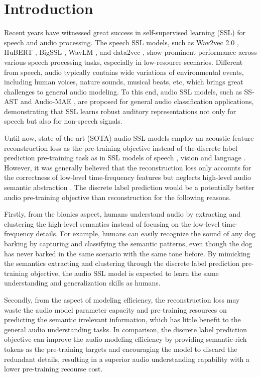 \documentclass{article}
\theoremstyle{plain}
\theoremstyle{definition}
\theoremstyle{remark}
\begin{document}
\section{Introduction}
Recent years have witnessed great success in self-supervised learning (SSL) for speech and audio processing. 
The speech SSL models, such as Wav2vec 2.0 \citep{baevski2020wav2vec}, HuBERT \citep{hsu2021hubert}, BigSSL \citep{zhang2022bigssl}, WavLM \citep{chen2022wavlm}, and data2vec \citep{baevski2022data2vec}, show prominent performance across various speech processing tasks, especially in low-resource scenarios. 
Different from speech, audio typically contains wide variations of environmental events, including human voices, nature sounds, musical beats, etc, which brings great challenges to general audio modeling.
To this end, audio SSL models, such as SS-AST \citep{gong2022ssast} and Audio-MAE \citep{xu2022masked}, are proposed for general audio classification applications, demonstrating that SSL learns robust auditory representations not only for speech but also for non-speech signals. 

Until now, state-of-the-art (SOTA) audio SSL models \citep{xu2022masked,chong2022masked} employ an acoustic feature reconstruction loss as the pre-training objective instead of the discrete label prediction pre-training task as in SSL models of 
speech \citep{hsu2021hubert,chen2022wavlm}, vision \citep{bao2021beit,beitv2,wang2022image} and language \citep{devlin2019bert,liu2019roberta,lan2019albert}. 
However, it was generally believed that the reconstruction loss only accounts for the correctness of low-level time-frequency features  but neglects high-level audio semantic abstraction \citep{ramesh2021zero,bao2021beit}. The discrete label prediction would be a potentially better audio pre-training objective than reconstruction for the following reasons.

Firstly, from the bionics aspect, humans understand audio by extracting and clustering the high-level semantics instead of focusing on the low-level time-frequency details.
For example, humans can easily recognize the sound of any dog barking by capturing and classifying the semantic patterns, even though the dog has never barked in the same scenario with the same tone before. 
By mimicking the semantics extracting and clustering through the discrete label prediction pre-training objective, the audio SSL model is expected to learn the same understanding and generalization skills as humans.

Secondly, from the aspect of modeling efficiency, the reconstruction loss may waste the audio model parameter capacity and pre-training resources on predicting the semantic irrelevant information, which has little benefit to the general audio understanding tasks.
In comparison, the discrete label prediction objective can improve the audio modeling efficiency by providing semantic-rich tokens as the pre-training targets and encouraging the model to discard the redundant details, resulting in a superior audio understanding capability with a lower pre-training recourse cost.
\end{document}
